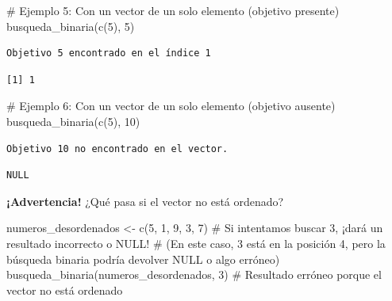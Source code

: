\documentclass[
  spanish,
  letterpaper,
  DIV=11,
  numbers=noendperiod]{scrreprt}
\newenvironment{Shaded}{\begin{snugshade}}{\end{snugshade}}
\newcommand{\CommentTok}[1]{\textcolor[rgb]{0.37,0.37,0.37}{#1}}
\newcommand{\DecValTok}[1]{\textcolor[rgb]{0.68,0.00,0.00}{#1}}
\newcommand{\FunctionTok}[1]{\textcolor[rgb]{0.28,0.35,0.67}{#1}}
\newcommand{\NormalTok}[1]{\textcolor[rgb]{0.00,0.23,0.31}{#1}}
\newcommand{\OtherTok}[1]{\textcolor[rgb]{0.00,0.23,0.31}{#1}}
\begin{document}
\begin{Shaded}
\begin{Highlighting}[]
\CommentTok{\# Ejemplo 5: Con un vector de un solo elemento (objetivo presente)}
\FunctionTok{busqueda\_binaria}\NormalTok{(}\FunctionTok{c}\NormalTok{(}\DecValTok{5}\NormalTok{), }\DecValTok{5}\NormalTok{)}
\end{Highlighting}
\end{Shaded}

\begin{verbatim}
Objetivo 5 encontrado en el índice 1
\end{verbatim}

\begin{verbatim}
[1] 1
\end{verbatim}

\begin{Shaded}
\begin{Highlighting}[]
\CommentTok{\# Ejemplo 6: Con un vector de un solo elemento (objetivo ausente)}
\FunctionTok{busqueda\_binaria}\NormalTok{(}\FunctionTok{c}\NormalTok{(}\DecValTok{5}\NormalTok{), }\DecValTok{10}\NormalTok{)}
\end{Highlighting}
\end{Shaded}

\begin{verbatim}
Objetivo 10 no encontrado en el vector.
\end{verbatim}

\begin{verbatim}
NULL
\end{verbatim}

\textbf{¡Advertencia!} ¿Qué pasa si el vector no está ordenado?

\begin{Shaded}
\begin{Highlighting}[]
\NormalTok{numeros\_desordenados }\OtherTok{\textless{}{-}} \FunctionTok{c}\NormalTok{(}\DecValTok{5}\NormalTok{, }\DecValTok{1}\NormalTok{, }\DecValTok{9}\NormalTok{, }\DecValTok{3}\NormalTok{, }\DecValTok{7}\NormalTok{)}
\CommentTok{\# Si intentamos buscar 3, ¡dará un resultado incorrecto o NULL!}
\CommentTok{\# (En este caso, 3 está en la posición 4, pero la búsqueda binaria podría devolver NULL o algo erróneo)}
\FunctionTok{busqueda\_binaria}\NormalTok{(numeros\_desordenados, }\DecValTok{3}\NormalTok{) }\CommentTok{\# Resultado erróneo porque el vector no está ordenado}
\end{Highlighting}
\end{Shaded}
\end{document}
